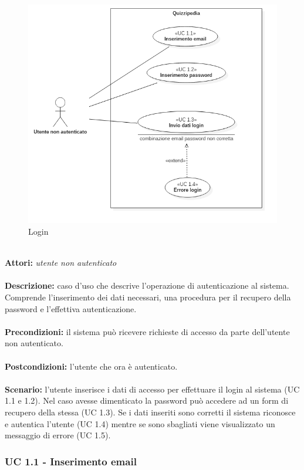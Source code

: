 \documentclass[a4paper,11pt]{article}
\begin{document}
\begin{figure}[h!]
\centering
\includegraphics[scale=0.6]{../immagini/UC1.png}
\caption{Login}
\end{figure}
\ \\
\textbf{Attori:} \textit{utente non autenticato}
\\ \\
\textbf{Descrizione:} caso d'uso che descrive l'operazione di autenticazione al sistema. Comprende l'inserimento dei dati necessari, una procedura per il recupero della password e l'effettiva autenticazione.\\
\\
\textbf{Precondizioni:} il sistema può ricevere richieste di accesso da parte dell’utente non autenticato.\\
\\
\textbf{Postcondizioni:} l’utente che ora è autenticato.\\
\\
\textbf{Scenario:} l’utente inserisce i dati di accesso per effettuare il login al sistema (UC 1.1 e 1.2). Nel caso avesse dimenticato la password può accedere ad un form di recupero della stessa (UC 1.3). Se i dati inseriti sono corretti il sistema riconosce e autentica l'utente (UC 1.4) mentre se sono sbagliati viene visualizzato un messaggio di errore (UC 1.5).\\


\subsubsection{UC 1.1 - Inserimento email}
\end{document}
